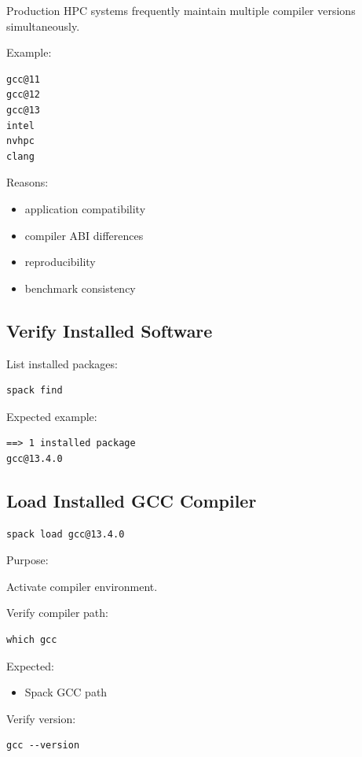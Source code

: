\documentclass[11pt]{article}
\begin{document}
Production HPC systems frequently maintain multiple compiler versions simultaneously.

Example:

\begin{verbatim}
gcc@11
gcc@12
gcc@13
intel
nvhpc
clang
\end{verbatim}

Reasons:

\begin{itemize}
\item application compatibility
\item compiler ABI differences
\item reproducibility
\item benchmark consistency
\end{itemize}
\subsection{Verify Installed Software}
\label{sec:org08d7368}

List installed packages:

\begin{verbatim}
spack find
\end{verbatim}

Expected example:

\begin{verbatim}
==> 1 installed package
gcc@13.4.0
\end{verbatim}
\subsection{Load Installed GCC Compiler}
\label{sec:orga44e938}

\begin{verbatim}
spack load gcc@13.4.0
\end{verbatim}

Purpose:

Activate compiler environment.

Verify compiler path:

\begin{verbatim}
which gcc
\end{verbatim}

Expected:
\begin{itemize}
\item Spack GCC path
\end{itemize}

Verify version:

\begin{verbatim}
gcc --version
\end{verbatim}
\end{document}
